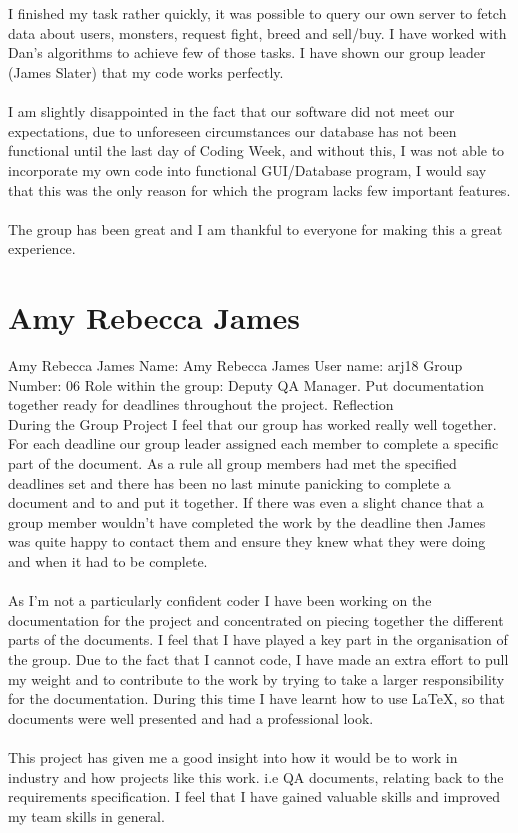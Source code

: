 \documentclass[titlepage]{article}
\begin{document}
{{{{{\\
\\
I finished my task rather quickly, it was possible to query our own server to fetch data about users, monsters, request fight, breed and sell/buy. I have worked with Dan’s algorithms to achieve few of those tasks. I have shown our group leader (James Slater) that my code works perfectly.
\\
\\
I am slightly disappointed in the fact that our software did not meet our expectations, due to unforeseen circumstances our database has not been functional until the last day of Coding Week, and without this, I was not able to incorporate my own code into functional GUI/Database program, I would say that this was the only reason for which the program lacks few important features.
\\
\\
The group has been great and I am thankful to everyone for making this a great experience.}
\section {Amy Rebecca James}

\normalsize {Amy Rebecca James}
\normalsize{Name:} Amy Rebecca James
\normalsize{User name:} arj18
\normalsize{Group Number:} 06
\normalsize{Role within the group:} Deputy QA Manager. Put documentation together ready for deadlines throughout the project. 
\normalsize{Reflection}
\\
During the Group Project I feel that our group has worked really well together. For each deadline our group leader assigned each member to complete a specific part of the document. As a rule all group members had met the specified deadlines set and there has been no last minute panicking to complete a document and to and put it together. If there was even a slight chance that a group member wouldn't have completed the work by the deadline then James was quite happy to contact them and ensure they knew what they were doing and when it had to be complete.\\
\\
As I'm not a particularly confident coder I have been working on the documentation for the project and concentrated on piecing together the different parts of the documents. I feel that I have played a key part in the organisation of the group.  Due to the fact that I cannot code, I have made an extra effort to pull my weight and to contribute to the work by trying to take a larger responsibility for the documentation. During this time I have learnt how to use \LaTeX, so that documents were well presented and had a professional look.\\
\\
This project has given me a good insight into how it would be to work in industry and how projects like this work. i.e  QA documents, relating back to the requirements specification. I feel that I have gained valuable skills and improved my team skills in general.
\newpage
}}}}
\end{document}

